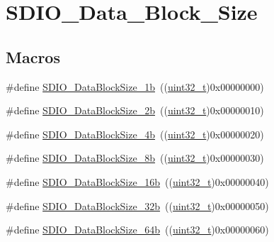 \hypertarget{group___s_d_i_o___data___block___size}{}\section{S\+D\+I\+O\+\_\+\+Data\+\_\+\+Block\+\_\+\+Size}
\label{group___s_d_i_o___data___block___size}
\subsection*{Macros}
\begin{DoxyCompactItemize}
\item 
\#define \hyperlink{group___s_d_i_o___data___block___size_gaa86e90ddc3426b242a5230b3360c620d}{S\+D\+I\+O\+\_\+\+Data\+Block\+Size\+\_\+1b}~((\hyperlink{_p_e___types_8h_a33594304e786b158f3fb30289278f5af}{uint32\+\_\+t})0x00000000)
\item 
\#define \hyperlink{group___s_d_i_o___data___block___size_ga7209d9d52635b66df85712c6fcd668ea}{S\+D\+I\+O\+\_\+\+Data\+Block\+Size\+\_\+2b}~((\hyperlink{_p_e___types_8h_a33594304e786b158f3fb30289278f5af}{uint32\+\_\+t})0x00000010)
\item 
\#define \hyperlink{group___s_d_i_o___data___block___size_ga59cbaecfdebd63177d1208c268626f0a}{S\+D\+I\+O\+\_\+\+Data\+Block\+Size\+\_\+4b}~((\hyperlink{_p_e___types_8h_a33594304e786b158f3fb30289278f5af}{uint32\+\_\+t})0x00000020)
\item 
\#define \hyperlink{group___s_d_i_o___data___block___size_ga14f91159c8c4faf49a335ed9b6a94d0b}{S\+D\+I\+O\+\_\+\+Data\+Block\+Size\+\_\+8b}~((\hyperlink{_p_e___types_8h_a33594304e786b158f3fb30289278f5af}{uint32\+\_\+t})0x00000030)
\item 
\#define \hyperlink{group___s_d_i_o___data___block___size_ga52a7bdab9a75edd94d9c1152e8b078e2}{S\+D\+I\+O\+\_\+\+Data\+Block\+Size\+\_\+16b}~((\hyperlink{_p_e___types_8h_a33594304e786b158f3fb30289278f5af}{uint32\+\_\+t})0x00000040)
\item 
\#define \hyperlink{group___s_d_i_o___data___block___size_gad0f89aa989c0cedf8d69eb28548413ca}{S\+D\+I\+O\+\_\+\+Data\+Block\+Size\+\_\+32b}~((\hyperlink{_p_e___types_8h_a33594304e786b158f3fb30289278f5af}{uint32\+\_\+t})0x00000050)
\item 
\#define \hyperlink{group___s_d_i_o___data___block___size_ga981c219228ae8df11a501e15843338d4}{S\+D\+I\+O\+\_\+\+Data\+Block\+Size\+\_\+64b}~((\hyperlink{_p_e___types_8h_a33594304e786b158f3fb30289278f5af}{uint32\+\_\+t})0x00000060)

\end{DoxyCompactItemize}

